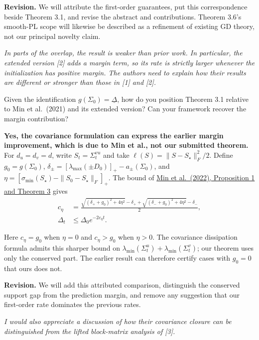 \documentclass[11pt,a4paper]{article}
\renewenvironment{quote}
  {\par\addvspace{0.8em}\Needspace{8\baselineskip}%
    \list{}{\leftmargin=1.2em\rightmargin=0pt\topsep=0.25em
    \parsep=0.3em}\item\relax\normalsize\itshape\color{quotegray}}
  {\endlist\nopagebreak[4]}
\begin{document}
\textbf{Revision.} We will attribute the first-order guarantees, put this correspondence beside Theorem 3.1, and revise the abstract and contributions. Theorem 3.6's smooth-PL scope will likewise be described as a refinement of existing GD theory, not our principal novelty claim.

\begin{quote}
In parts of the overlap, the result is weaker than prior work. In particular, the extended version {[}2{]} adds a margin term, so its rate is strictly larger whenever the initialization has positive margin. The authors need to explain how their results are different or stronger than those in {[}1{]} and {[}2{]}.

Given the identification \(g(\Sigma_0)=\underline\Delta\), how do you position Theorem 3.1 relative to Min et al.~(2021) and its extended version? Can your framework recover the margin contribution?
\end{quote}

\textbf{Yes, the covariance formulation can express the earlier margin improvement, which is due to Min et al., not our submitted theorem.} For \(d_u=d_v=d\), write \(S_t=\Sigma_t^{vu}\) and take \(\ell(S)=\|S-S_\star\|_F^2/2\). Define \(g_0=g(\Sigma_0)\), \(\delta_\pm=[\lambda_{\max}(\pm D_0)]_+-a_\pm(\Sigma_0)\), and \(\eta=[\sigma_{\min}(S_\star)-\|S_0-S_\star\|_F]_+\). The bound of \href{https://arxiv.org/pdf/2105.06351}{Min et al.~(2022), Proposition 1 and Theorem 3} gives
\[
\begin{aligned}
c_\eta&=\frac{\sqrt{(\delta_++g_0)^2+4\eta^2}-\delta_+
+\sqrt{(\delta_-+g_0)^2+4\eta^2}-\delta_-}{2},\\[3pt]
\Delta_t&\le\Delta_0e^{-2c_\eta t}.
\end{aligned}
\]

Here \(c_\eta=g_0\) when \(\eta=0\) and \(c_\eta>g_0\) when \(\eta>0\). The covariance dissipation formula admits this sharper bound on \(\lambda_{\min}(\Sigma^u_t)+\lambda_{\min}(\Sigma^v_t)\); our theorem uses only the conserved part. The earlier result can therefore certify cases with \(g_0=0\) that ours does not.

\textbf{Revision.} We will add this attributed comparison, distinguish the conserved support gap from the prediction margin, and remove any suggestion that our first-order rate dominates the previous rates.

\begin{quote}
I would also appreciate a discussion of how their covariance closure can be distinguished from the lifted block-matrix analysis of {[}3{]}.
\end{quote}
\end{document}
